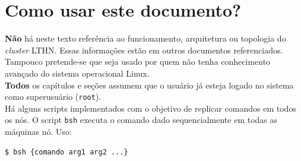 \documentclass[11pt,a4]{report} %
\begin{document}
\chapter*{Como usar este documento?}

\textbf{Não} há neste texto referência ao funcionamento, arquitetura
  ou topologia do \textit{cluster} LTHN. Essas informações estão em outros documentos referenciados. Tampouco pretende-se
  que seja usado por quem não tenha conhecimento avançado do sistema operacional Linux.\\
  
  \textbf{Todos} os capítulos e seções assumem que o usuário já esteja logado no sistema como superusuário (\texttt{root}).\\
  Há alguns scripts implementados com o objetivo de replicar comandos em todos os nós. O script \texttt{bsh} executa o comando dado sequencialmente em todas as máquinas nó. Uso:

  \begin{lstlisting}[language=bash,basicstyle=\small]
    $ bsh {comando arg1 arg2 ...}
  \end{lstlisting}



\end{document}
